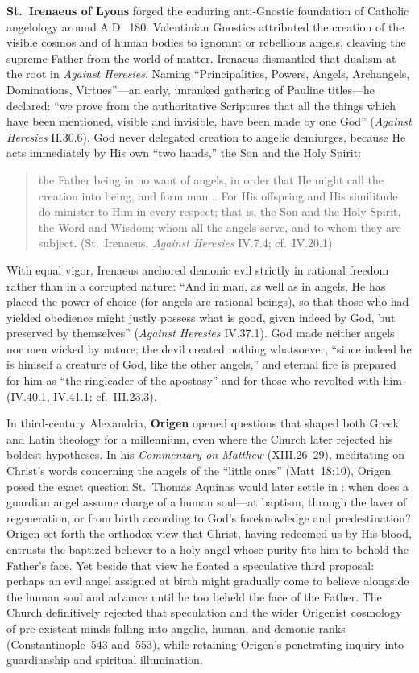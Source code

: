 \textbf{St.~Irenaeus of Lyons} forged the enduring anti-Gnostic foundation of Catholic angelology around A.D.~180. Valentinian Gnostics attributed the creation of the visible cosmos and of human bodies to ignorant or rebellious angels, cleaving the supreme Father from the world of matter. Irenaeus dismantled that dualism at the root in \emph{Against Heresies}. Naming ``Principalities, Powers, Angels, Archangels, Dominations, Virtues''---an early, unranked gathering of Pauline titles---he declared: ``we prove from the authoritative Scriptures that all the things which have been mentioned, visible and invisible, have been made by one God'' (\emph{Against Heresies} II.30.6). God never delegated creation to angelic demiurges, because He acts immediately by His own ``two hands,'' the Son and the Holy Spirit:
\begin{quotation}
the Father being in no want of angels, in order that He might call the creation into being, and form man... For His offspring and His similitude do minister to Him in every respect; that is, the Son and the Holy Spirit, the Word and Wisdom; whom all the angels serve, and to whom they are subject. (St.~Irenaeus, \emph{Against Heresies} IV.7.4; cf.~IV.20.1)
\end{quotation}
With equal vigor, Irenaeus anchored demonic evil strictly in rational freedom rather than in a corrupted nature: ``And in man, as well as in angels, He has placed the power of choice (for angels are rational beings), so that those who had yielded obedience might justly possess what is good, given indeed by God, but preserved by themselves'' (\emph{Against Heresies} IV.37.1). God made neither angels nor men wicked by nature; the devil created nothing whatsoever, ``since indeed he is himself a creature of God, like the other angels,'' and eternal fire is prepared for him as ``the ringleader of the apostasy'' and for those who revolted with him (IV.40.1, IV.41.1; cf.~III.23.3).

In third-century Alexandria, \textbf{Origen} opened questions that shaped both Greek and Latin theology for a millennium, even where the Church later rejected his boldest hypotheses. In his \emph{Commentary on Matthew} (XIII.26--29), meditating on Christ's words concerning the angels of the ``little ones'' (Matt~18:10), Origen posed the exact question St.~Thomas Aquinas would later settle in : when does a guardian angel assume charge of a human soul---at baptism, through the laver of regeneration, or from birth according to God's foreknowledge and predestination? Origen set forth the orthodox view that Christ, having redeemed us by His blood, entrusts the baptized believer to a holy angel whose purity fits him to behold the Father's face. Yet beside that view he floated a speculative third proposal: perhaps an evil angel assigned at birth might gradually come to believe alongside the human soul and advance until he too beheld the face of the Father. The Church definitively rejected that speculation and the wider Origenist cosmology of pre-existent minds falling into angelic, human, and demonic ranks (Constantinople~543 and~553), while retaining Origen's penetrating inquiry into guardianship and spiritual illumination.

